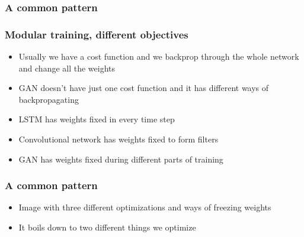 \documentclass{beamer}
\begin{document}
\begin{frame}
	\frametitle{A common pattern}
	\begin{itemize}
	\end{itemize}
\end{frame}

\begin{frame}
	\frametitle{Modular training, different objectives}
	\begin{itemize}
		\item Usually we have a cost function and we backprop through the whole network and change all the weights
		\item GAN doesn't have just one cost function and it has different ways of backpropagating
		\item LSTM has weights fixed in every time step
		\item Convolutional network has weights fixed to form filters
		\item GAN has weights fixed during different parts of training
	\end{itemize}
\end{frame}


\begin{frame}
	\frametitle{A common pattern}
	\begin{itemize}
		\item Image with three different optimizations and ways of freezing weights
		\item It boils down to two different things we optimize
	\end{itemize}
\end{frame}
\end{document}
